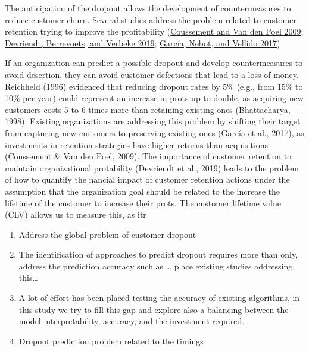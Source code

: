\documentclass[
  12pt,
]{article}
\newenvironment{Shaded}{\begin{snugshade}}{\end{snugshade}}
\newcommand{\NormalTok}[1]{#1}
\providecommand{\tightlist}{%
  \setlength{\itemsep}{0pt}\setlength{\parskip}{0pt}}
\begin{document}
The anticipation of the dropout allows the development of countermeasures to
reduce customer churn. Several studies address the problem related to customer
retention trying to improve the profitability (\protect\hyperlink{ref-coussement_improving_2009}{Coussement and Van den Poel 2009}; \protect\hyperlink{ref-devriendt_why_2019}{Devriendt, Berrevoets, and Verbeke 2019}; \protect\hyperlink{ref-garcia_intelligent_2017}{García, Nebot, and Vellido 2017})

\begin{Shaded}
\begin{Highlighting}[]
\NormalTok{If an organization can predict a possible dropout and}
\NormalTok{develop countermeasures to avoid desertion, they can avoid customer defections that }
\NormalTok{lead to a loss of money. Reichheld (1996) evidenced that reducing dropout rates by 5\% }
\NormalTok{(e.g., from 15\% to 10\% per year) could represent an increase in prots up to double, as }
\NormalTok{acquiring new customers costs 5 to 6 times more than retaining existing ones (Bhattacharya, }
\NormalTok{1998). Existing organizations are addressing this problem by shifting their target from }
\NormalTok{capturing new customers to preserving existing ones (García et al., 2017),}
\NormalTok{as investments in retention strategies have higher returns than acquisitions (Coussement }
\NormalTok{\& Van den Poel, 2009). The importance of customer retention to maintain organizational protability (Devriendt}
\NormalTok{et al., 2019) leads to the problem of how to quantify the nancial impact of customer retention actions}
\NormalTok{under the assumption that the organization goal should be related to the increase the lifetime of the}
\NormalTok{customer to increase their prots. The customer lifetime value (CLV) allows us to measure this, as itr}
\end{Highlighting}
\end{Shaded}

\begin{enumerate}
\def\labelenumi{\arabic{enumi}.}
\tightlist
\item
  Address the global problem of customer dropout
\item
  The identification of approaches to predict dropout requires more than only,
  address the prediction accuracy such as \ldots{} place existing studies
  addressing this\ldots{}
\item
  A lot of effort has been placed testing the accuracy of existing algorithms,
  in this study we try to fill this gap and explore also a balancing between
  the model interpretability, accuracy, and the investment required.
\item
  Dropout prediction problem related to the timings
\end{enumerate}
\end{document}
